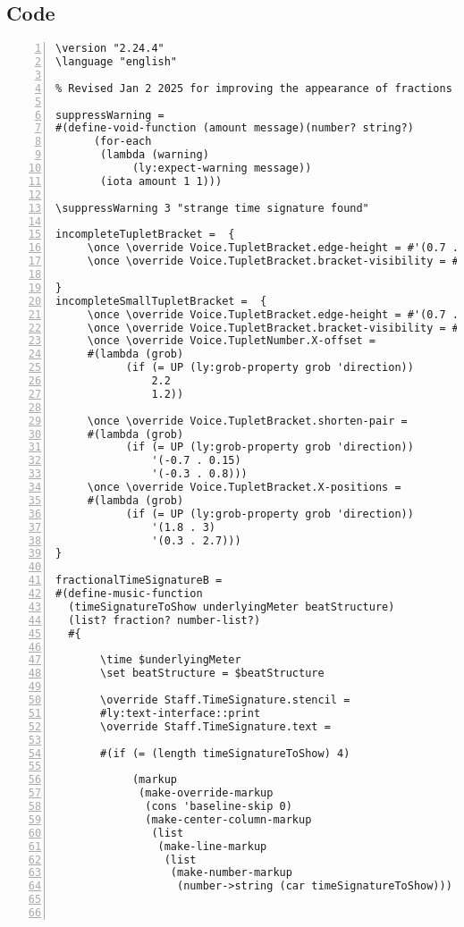 \subsection{Code}
\begin{Verbatim}[numbers=left,xleftmargin=5mm]
\version "2.24.4"
\language "english"

% Revised Jan 2 2025 for improving the appearance of fractions

suppressWarning =
#(define-void-function (amount message)(number? string?)
      (for-each
       (lambda (warning)
            (ly:expect-warning message))
       (iota amount 1 1)))

\suppressWarning 3 "strange time signature found"

incompleteTupletBracket =  {
     \once \override Voice.TupletBracket.edge-height = #'(0.7 . 0)
     \once \override Voice.TupletBracket.bracket-visibility = ##t

}
incompleteSmallTupletBracket =  {
     \once \override Voice.TupletBracket.edge-height = #'(0.7 . 0)
     \once \override Voice.TupletBracket.bracket-visibility = ##t
     \once \override Voice.TupletNumber.X-offset =
     #(lambda (grob)
           (if (= UP (ly:grob-property grob 'direction))
               2.2
               1.2))

     \once \override Voice.TupletBracket.shorten-pair =
     #(lambda (grob)
           (if (= UP (ly:grob-property grob 'direction))
               '(-0.7 . 0.15)
               '(-0.3 . 0.8)))
     \once \override Voice.TupletBracket.X-positions =
     #(lambda (grob)
           (if (= UP (ly:grob-property grob 'direction))
               '(1.8 . 3)
               '(0.3 . 2.7)))
}

fractionalTimeSignatureB =
#(define-music-function
  (timeSignatureToShow underlyingMeter beatStructure)
  (list? fraction? number-list?)
  #{

       \time $underlyingMeter
       \set beatStructure = $beatStructure

       \override Staff.TimeSignature.stencil =
       #ly:text-interface::print
       \override Staff.TimeSignature.text =

       #(if (= (length timeSignatureToShow) 4)

            (markup
             (make-override-markup
              (cons 'baseline-skip 0)
              (make-center-column-markup
               (list
                (make-line-markup
                 (list
                  (make-number-markup
                   (number->string (car timeSignatureToShow)))



\end{Verbatim}
